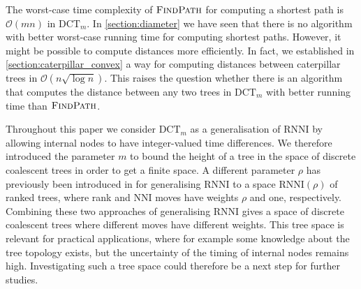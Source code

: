 \documentclass[11pt]{amsart}
\newcommand{\rnni}{\mathrm{RNNI}}
\newcommand{\findpath}{\textsc{FindPath}}
\newcommand{\nni}{\mathrm{NNI}}
\newcommand{\dct}{\mathrm{DCT}}
\renewcommand{\O}{\mathcal O}
\newcommand{\summary}[1]{} %
\providecommand{\DIFaddtex}[1]{{\protect\color{blue}\uwave{#1}}} %
\providecommand{\DIFdeltex}[1]{{\protect\color{red}\sout{#1}}}                      %
\providecommand{\DIFaddbegin}{} %
\providecommand{\DIFaddend}{} %
\providecommand{\DIFdelbegin}{} %
\providecommand{\DIFdelend}{} %
\providecommand{\DIFadd}[1]{\texorpdfstring{\DIFaddtex{#1}}{#1}} %
\providecommand{\DIFdel}[1]{\texorpdfstring{\DIFdeltex{#1}}{}} %
\newcommand{\DIFscaledelfig}{0.5}
\newlength{\DIFdelgraphicswidth} %
\newlength{\DIFdelgraphicsheight} %
\newcommand{\DIFaddincludegraphics}[2][]{{\color{blue}\fbox{\DIFOincludegraphics[#1]{#2}}}} %
\newcommand{\DIFdelincludegraphics}[2][]{%
\sbox{\DIFdelgraphicsbox}{\DIFOincludegraphics[#1]{#2}}%
\settoboxwidth{\DIFdelgraphicswidth}{\DIFdelgraphicsbox} %
\settoboxtotalheight{\DIFdelgraphicsheight}{\DIFdelgraphicsbox} %
\scalebox{\DIFscaledelfig}{%
\parbox[b]{\DIFdelgraphicswidth}{\usebox{\DIFdelgraphicsbox}\\[-\baselineskip] \rule{\DIFdelgraphicswidth}{0em}}\llap{\resizebox{\DIFdelgraphicswidth}{\DIFdelgraphicsheight}{%
\setlength{\unitlength}{\DIFdelgraphicswidth}%
\begin{picture}(1,1)%
\thicklines\linethickness{2pt} %
{\color[rgb]{1,0,0}\put(0,0){\framebox(1,1){}}}%
{\color[rgb]{1,0,0}\put(0,0){\line( 1,1){1}}}%
{\color[rgb]{1,0,0}\put(0,1){\line(1,-1){1}}}%
\end{picture}%
}\hspace*{3pt}}} %
} %
\DeclareRobustCommand{\DIFaddbegin}{\DIFOaddbegin \let\includegraphics\DIFaddincludegraphics} %
\DeclareRobustCommand{\DIFaddend}{\DIFOaddend \let\includegraphics\DIFOincludegraphics} %
\DeclareRobustCommand{\DIFdelbegin}{\DIFOdelbegin \let\includegraphics\DIFdelincludegraphics} %
\DeclareRobustCommand{\DIFdelend}{\DIFOaddend \let\includegraphics\DIFOincludegraphics} %
\begin{document}
\summary{More efficient algorithm for computing distances (not shortest paths)}
The worst-case time complexity of \DIFdelbegin \DIFdel{$\findpath$ }\DIFdelend \DIFaddbegin \DIFadd{$\findpath^+$ }\DIFaddend for computing a shortest path is $\O(mn)$ in $\dct_m$.
In \autoref{section:diameter} we have seen that there is no algorithm with better worst-case running time for computing shortest paths.
However, it might be possible to compute distances more efficiently.
In fact, we established in \autoref{section:caterpillar_convex} a way for computing distances between caterpillar trees in $\O(n \sqrt{\log n})$.
This raises the question whether there is an algorithm that computes the distance between any two trees in $\dct_m$ with better running time than \DIFdelbegin \DIFdel{$\findpath$}\DIFdelend \DIFaddbegin \DIFadd{$\findpath^+$}\DIFaddend .

\summary{$\rnni(rho)$ and parameter $\rho$ for discrete coalescent trees}
Throughout this paper we consider $\dct_m$ as a generalisation of $\rnni$ by allowing internal nodes to have integer-valued time differences.
We therefore introduced the parameter $m$ to bound the height of a tree in the space of discrete coalescent trees in order to get a finite space.
A different parameter $\rho$ has previously been introduced in \DIFdelbegin %
\DIFdelend \DIFaddbegin \textcite{Collienne2021} \DIFaddend for generalising $\rnni$ to a space $\rnni(\rho)$ of ranked trees, where rank and $\nni$ moves have weights $\rho$ and one, respectively.
Combining these two approaches of generalising $\rnni$ gives a space of discrete coalescent trees where different moves have different weights.
This tree space is relevant for practical applications, where for example some knowledge about the tree topology exists, but the uncertainty of the timing of internal nodes remains high.
Investigating such a tree space could therefore be a next step for further studies.
\end{document}
